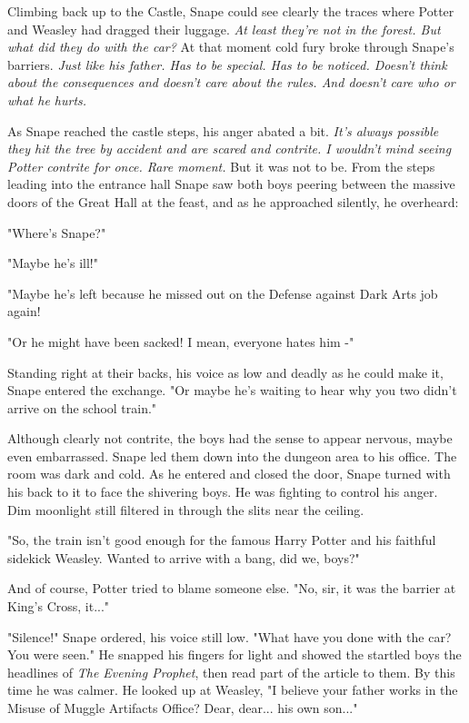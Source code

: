 \documentclass[a4paper,11pt]{article}
\begin{document}
Climbing back up to the Castle, Snape could see clearly the traces where Potter and Weasley had dragged their luggage. \emph{At least they're not in the forest. But what did they do with the car?} At that moment cold fury broke through Snape's barriers. \emph{Just like his father. Has to be special. Has to be noticed. Doesn't think about the consequences and doesn't care about the rules. And doesn't care who or what he hurts.}

As Snape reached the castle steps, his anger abated a bit. \emph{It's always possible they hit the tree by accident and are scared and contrite. I wouldn't mind seeing Potter contrite for once. Rare moment.} But it was not to be. From the steps leading into the entrance hall Snape saw both boys peering between the massive doors of the Great Hall at the feast, and as he approached silently, he overheard:

"Where's Snape?"

"Maybe he's ill!"

"Maybe he's left because he missed out on the Defense against Dark Arts job again!

"Or he might have been sacked! I mean, everyone hates him -"

Standing right at their backs, his voice as low and deadly as he could make it, Snape entered the exchange. "Or maybe he's waiting to hear why you two didn't arrive on the school train."

Although clearly not contrite, the boys had the sense to appear nervous, maybe even embarrassed. Snape led them down into the dungeon area to his office. The room was dark and cold. As he entered and closed the door, Snape turned with his back to it to face the shivering boys. He was fighting to control his anger. Dim moonlight still filtered in through the slits near the ceiling.

"So, the train isn't good enough for the famous Harry Potter and his faithful sidekick Weasley. Wanted to arrive with a bang, did we, boys?"

And of course, Potter tried to blame someone else. "No, sir, it was the barrier at King's Cross, it..."

"Silence!" Snape ordered, his voice still low. "What have you done with the car? You were seen." He snapped his fingers for light and showed the startled boys the headlines of \emph{The Evening Prophet}, then read part of the article to them. By this time he was calmer. He looked up at Weasley, "I believe your father works in the Misuse of Muggle Artifacts Office? Dear, dear... his own son..."
\end{document}
